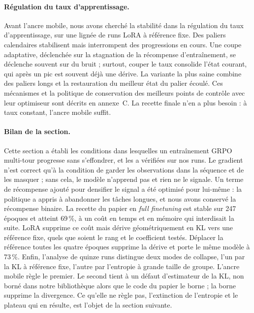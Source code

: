 \documentclass[11pt,a4paper]{article}
\begin{document}
\paragraph{Régulation du taux d'apprentissage.} Avant l'ancre mobile, nous avons cherché la stabilité dans la régulation du taux d'apprentissage, sur une lignée de runs LoRA à référence fixe. Des paliers calendaires stabilisent mais interrompent des progressions en cours. Une coupe adaptative, déclenchée sur la stagnation de la récompense d'entraînement, se déclenche souvent sur du bruit ; surtout, couper le taux consolide l'état courant, qui après un pic est souvent déjà une dérive. La variante la plus saine combine des paliers longs et la restauration du meilleur état du palier écoulé. Ces mécanismes et la politique de conservation des meilleurs points de contrôle avec leur optimiseur sont décrits en annexe~C. La recette finale n'en a plus besoin : à taux constant, l'ancre mobile suffit.

\paragraph{Bilan de la section.} Cette section a établi les conditions dans lesquelles un entraînement GRPO multi-tour progresse sans s'effondrer, et les a vérifiées sur nos runs. Le gradient n'est correct qu'à la condition de garder les observations dans la séquence et de les masquer ; sans cela, le modèle n'apprend pas et rien ne le signale. Un terme de récompense ajouté pour densifier le signal a été optimisé pour lui-même : la politique a appris à abandonner les tâches longues, et nous avons conservé la récompense binaire. La recette du papier en \emph{full finetuning} est stable sur 247 époques et atteint 69\,\%, à un coût en temps et en mémoire qui interdisait la suite. LoRA supprime ce coût mais dérive géométriquement en KL vers une référence fixe, quels que soient le rang et le coefficient testés. Déplacer la référence toutes les quatre époques supprime la dérive et porte le même modèle à 73\,\%. Enfin, l'analyse de quinze runs distingue deux modes de collapse, l'un par la KL à référence fixe, l'autre par l'entropie à grande taille de groupe. L'ancre mobile règle le premier. Le second tient à un défaut d'estimateur de la KL, non borné dans notre bibliothèque alors que le code du papier le borne ; la borne supprime la divergence. Ce qu'elle ne règle pas, l'extinction de l'entropie et le plateau qui en résulte, est l'objet de la section suivante.
\end{document}
